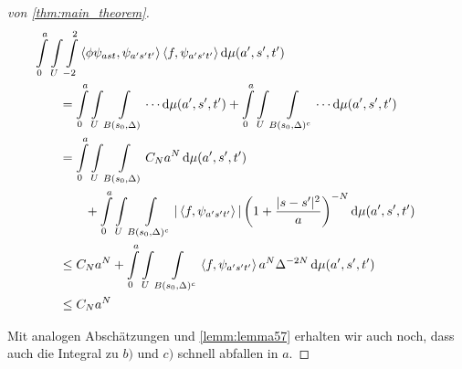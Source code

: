 \begin{proof}[von \ref{thm:main_theorem}]
\begin{align*}
&\kern -2em
 \int\limits_{0}^{a} \int\limits_{U} \int\limits_{-2}^2
 \left\langle \phi \psi_{ast}, \psi_{a's't'} \right\rangle
 \left\langle f, \psi_{a's't'} \right\rangle
    \d \mu(a',s',t')
\\&=
 \int\limits_{0}^{a} \int\limits_{U} \int\limits_{B(s_0,\Delta)}
 \cdots
    \d \mu(a',s',t')
    +
 \int\limits_{0}^{a} \int\limits_{U} \int\limits_{B(s_0,\Delta)^c}
 \cdots
    \d \mu(a',s',t')
\\&=
 \int\limits_{0}^{a} \int\limits_{U} \int\limits_{B(s_0,\Delta)} C_N a^N
 \d \mu(a',s',t')
 \\&\kern +2em+
 \int\limits_{0}^{a} \int\limits_{U} \int\limits_{B(s_0,\Delta)^c}
 |\left\langle f, \psi_{a's't'} \right\rangle|
 \left(1+\frac{|s-s'|^2}{a}\right)^{-N}
 \d \mu(a',s',t')
 \\ &\leq
 C_N a^N +
  \int\limits_{0}^{a} \int\limits_{U} \int\limits_{B(s_0,\Delta)^c}
 \left\langle f, \psi_{a's't'} \right\rangle
 a^N \Delta^{-2N}
 \d \mu(a',s',t')
 \\&\leq
 C_N a^N
\end{align*}

Mit analogen Abschätzungen und \cref{lemm:lemma57} erhalten wir auch noch, dass auch die Integral zu $b)$ und $c)$ schnell abfallen in $a$.

\end{proof}



